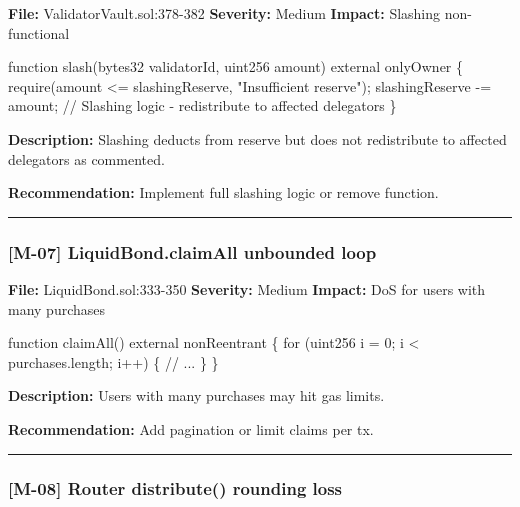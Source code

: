 \documentclass[
]{article}
\newenvironment{Shaded}{}{}
\newcommand{\NormalTok}[1]{#1}
\begin{document}
\textbf{File:} ValidatorVault.sol:378-382 \textbf{Severity:} Medium
\textbf{Impact:} Slashing non-functional

\begin{Shaded}
\begin{Highlighting}[]
\NormalTok{function slash(bytes32 validatorId, uint256 amount) external onlyOwner \{}
\NormalTok{    require(amount \textless{}= slashingReserve, "Insufficient reserve");}
\NormalTok{    slashingReserve {-}= amount;}
\NormalTok{    // Slashing logic {-} redistribute to affected delegators}
\NormalTok{\}}
\end{Highlighting}
\end{Shaded}

\textbf{Description:} Slashing deducts from reserve but does not
redistribute to affected delegators as commented.

\textbf{Recommendation:} Implement full slashing logic or remove
function.

\begin{center}\rule{0.5\linewidth}{0.5pt}\end{center}

\subsubsection{{[}M-07{]} LiquidBond.claimAll unbounded
loop}\label{m-07-liquidbondclaimall-unbounded-loop}

\textbf{File:} LiquidBond.sol:333-350 \textbf{Severity:} Medium
\textbf{Impact:} DoS for users with many purchases

\begin{Shaded}
\begin{Highlighting}[]
\NormalTok{function claimAll() external nonReentrant \{}
\NormalTok{    for (uint256 i = 0; i \textless{} purchases.length; i++) \{}
\NormalTok{        // ...}
\NormalTok{    \}}
\NormalTok{\}}
\end{Highlighting}
\end{Shaded}

\textbf{Description:} Users with many purchases may hit gas limits.

\textbf{Recommendation:} Add pagination or limit claims per tx.

\begin{center}\rule{0.5\linewidth}{0.5pt}\end{center}

\subsubsection{{[}M-08{]} Router distribute() rounding
loss}\label{m-08-router-distribute-rounding-loss}
\end{document}
